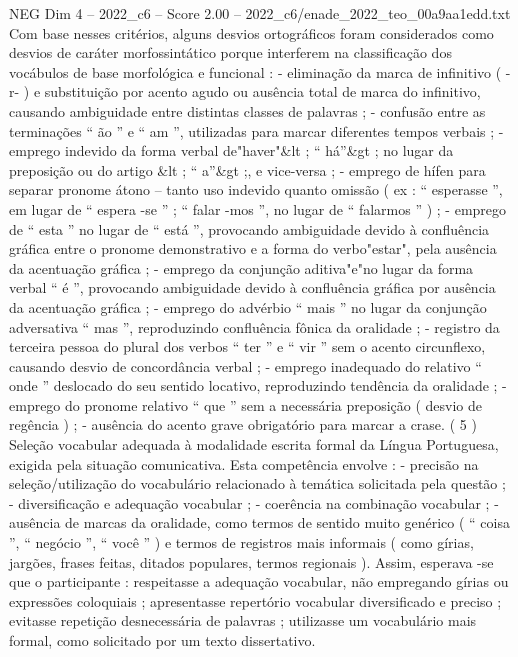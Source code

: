 \begin{textsample}{NEG Dim 4 – 2022\_c6 – Score 2.00 – 2022\_c6/enade\_2022\_teo\_00a9aa1edd.txt}
Com base nesses critérios, alguns desvios ortográficos foram considerados como desvios de caráter morfossintático porque interferem na classificação dos vocábulos de base morfológica e funcional : - eliminação da marca de infinitivo ( -r- ) e substituição por acento agudo ou ausência total de marca do infinitivo, causando ambiguidade entre distintas classes de palavras ; - confusão entre as terminações “ ão ” e “ am ”, utilizadas para marcar diferentes tempos verbais ; - emprego indevido da forma verbal de"haver"\&lt ; “ há”\&gt ; no lugar da preposição ou do artigo \&lt ; “ a”\&gt ;, e vice-versa ; - emprego de hífen para separar pronome átono – tanto uso indevido quanto omissão ( ex : “ esperasse ”, em lugar de “ espera -se ” ; “ falar -mos ”, no lugar de “ falarmos ” ) ; - emprego de “ esta ” no lugar de “ está ”, provocando ambiguidade devido à confluência gráfica entre o pronome demonstrativo e a forma do verbo"estar", pela ausência da acentuação gráfica ; - emprego da conjunção aditiva"e"no lugar da forma verbal “ é ”, provocando ambiguidade devido à confluência gráfica por ausência da acentuação gráfica ; - emprego do advérbio “ mais ” no lugar da conjunção adversativa “ mas ”, reproduzindo confluência fônica da oralidade ; - registro da terceira pessoa do plural dos verbos “ ter ” e “ vir ” sem o acento circunflexo, causando desvio de concordância verbal ; - emprego inadequado do relativo “ onde ” deslocado do seu sentido locativo, reproduzindo tendência da oralidade ; - emprego do pronome relativo “ que ” sem a necessária preposição ( desvio de regência ) ; - ausência do acento grave obrigatório para marcar a crase. ( 5 ) Seleção vocabular adequada à modalidade escrita formal da Língua Portuguesa, exigida pela situação comunicativa.
Esta competência envolve : - precisão na seleção/utilização do vocabulário relacionado à temática solicitada pela questão ; - diversificação e adequação vocabular ; - coerência na combinação vocabular ; - ausência de marcas da oralidade, como termos de sentido muito genérico ( “ coisa ”, “ negócio ”, “ você ” ) e termos de registros mais informais ( como gírias, jargões, frases feitas, ditados populares, termos regionais ).
Assim, esperava -se que o participante : respeitasse a adequação vocabular, não empregando gírias ou expressões coloquiais ; apresentasse repertório vocabular diversificado e preciso ; evitasse repetição desnecessária de palavras ; utilizasse um vocabulário mais formal, como solicitado por um texto dissertativo.

\end{textsample}
